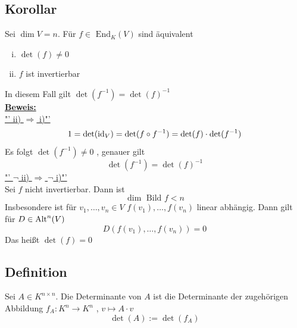 \subsection{Korollar} %
\label{sub:korollar}
Sei $\dim V = n$. Für $f \in \text{ End}_K (V)$ sind äquivalent
\begin{enumerate}[(i)]
	\item $\det (f) \not= 0$
	\item $f$ ist invertierbar
\end{enumerate}
In diesem Fall gilt $\det (f ^{-1}) = \det (f) ^{-1}$
\vspace{\baselineskip} \\
\underline{\textbf{Beweis:}} \\
\underline{"' ii) $\Rightarrow $ i)"' }
\vspace{10pt} \\
\[
	1 = \det (\operatorname{id}_V) = \det ( f \circ f ^{-1}) = \det (f) \cdot \det (f ^{-1})
\]
Es folgt $\det (f ^{-1}) \not= 0$ , genauer gilt 
\[
	\det (f ^{-1}) = \det (f) ^{-1}
\]
\underline{"' $\neg$ ii) $\Rightarrow $ $\neg$ i)"' } \\
Sei $f$ nicht invertierbar. Dann ist 
\[
	\dim \text{ Bild }f < n
\]
Insbesondere ist für $v_1, \ldots , v_n \in V$ $f(v_1), \ldots , f(v_n)$ linear abhängig. Dann gilt für $D \in \operatorname{Alt}^n(V)$
\[
	D(f(v_1), \ldots , f(v_n)) = 0
\]
Das heißt $\det (f) = 0$

\subsection{Definition} %
\label{sub:definition}
Sei $A \in K^{n \times n}$. Die Determinante von $A$ ist die Determinante der zugehörigen Abbildung $f_A : K^n \to K^n$ , $v \mapsto A \cdot v$
\[
	\det (A) := \det (f_A)
\]

